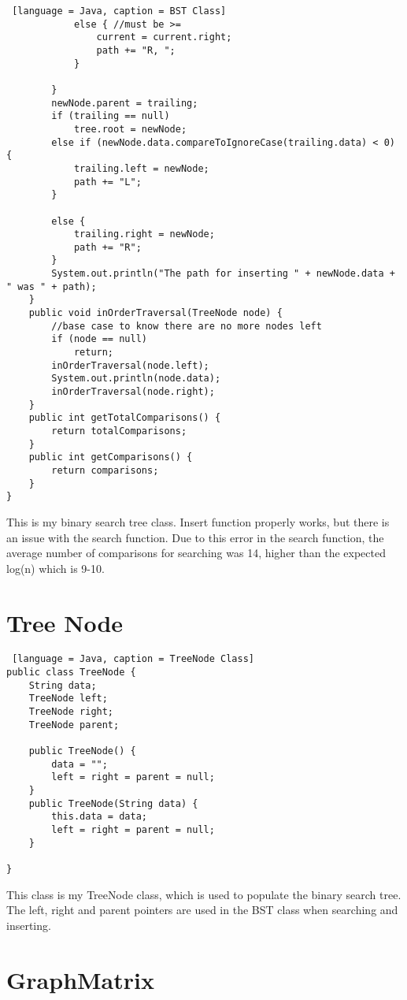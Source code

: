 \documentclass{article}
\begin{document}
\begin{lstlisting} [language = Java, caption = BST Class]
            else { //must be >=
                current = current.right;
                path += "R, ";
            } 
                
        }
        newNode.parent = trailing;
        if (trailing == null)
            tree.root = newNode;
        else if (newNode.data.compareToIgnoreCase(trailing.data) < 0) {
            trailing.left = newNode;
            path += "L";
        }
            
        else {
            trailing.right = newNode;
            path += "R";
        }
        System.out.println("The path for inserting " + newNode.data + " was " + path);  
    }
    public void inOrderTraversal(TreeNode node) {
        //base case to know there are no more nodes left
        if (node == null)
            return;
        inOrderTraversal(node.left);
        System.out.println(node.data);
        inOrderTraversal(node.right);
    }
    public int getTotalComparisons() {
        return totalComparisons;
    }
    public int getComparisons() {
        return comparisons;
    }
}

\end{lstlisting}
\noindent This is my binary search tree class. Insert function properly works, but there is an issue with the search function. Due to this error in the search function, the average number of comparisons for searching was 14, higher than the expected log(n) which is 9-10.

\section{Tree Node}

\begin{lstlisting} [language = Java, caption = TreeNode Class]
public class TreeNode {
    String data;
    TreeNode left;
    TreeNode right;
    TreeNode parent;

    public TreeNode() {
        data = "";
        left = right = parent = null;
    }
    public TreeNode(String data) {
        this.data = data;
        left = right = parent = null;
    }
    
}
\end{lstlisting}

\noindent This class is my TreeNode class, which is used to populate the binary search tree. The left, right and parent pointers are used in the BST class when searching and inserting. 

\section{GraphMatrix}
\end{document}
